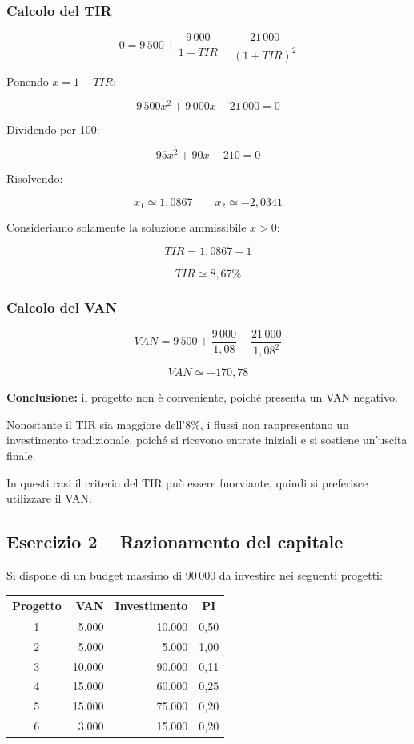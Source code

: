 \subsubsection*{Calcolo del TIR}

\[
0=9\,500+\frac{9\,000}{1+TIR}
-\frac{21\,000}{(1+TIR)^2}
\]

\noindent Ponendo $x=1+TIR$:

\[
9\,500x^2+9\,000x-21\,000=0
\]

\noindent Dividendo per 100:

\[
95x^2+90x-210=0
\]

\noindent Risolvendo:

\[
x_1\simeq1{,}0867
\qquad
x_2\simeq-2{,}0341
\]

\noindent Consideriamo solamente la soluzione ammissibile $x>0$:

\[
TIR=1{,}0867-1
\]

\[
\boxed{TIR\simeq8{,}67\%}
\]

\subsubsection*{Calcolo del VAN}

\[
VAN=9\,500+\frac{9\,000}{1{,}08}
-\frac{21\,000}{1{,}08^2}
\]

\[
\boxed{VAN\simeq-170{,}78}
\]

\noindent \textbf{Conclusione:} il progetto non è conveniente,
poiché presenta un VAN negativo.

\medskip

\noindent Nonostante il TIR sia maggiore dell'8\%, i flussi
non rappresentano un investimento tradizionale,
poiché si ricevono entrate iniziali e si sostiene un'uscita finale.

\noindent In questi casi il criterio del TIR può essere fuorviante,
quindi si preferisce utilizzare il VAN.


\subsection{Esercizio 2 -- Razionamento del capitale}

\noindent Si dispone di un budget massimo di $90\,000$
da investire nei seguenti progetti:

\begin{center}
\begin{tabular}{|c|r|r|c|}
\hline
\textbf{Progetto} & \textbf{VAN} &
\textbf{Investimento} & \textbf{PI} \\
\hline
1 & 5.000 & 10.000 & 0,50 \\
2 & 5.000 & 5.000 & 1,00 \\
3 & 10.000 & 90.000 & 0,11 \\
4 & 15.000 & 60.000 & 0,25 \\
5 & 15.000 & 75.000 & 0,20 \\
6 & 3.000 & 15.000 & 0,20 \\
\hline
\end{tabular}
\end{center}

